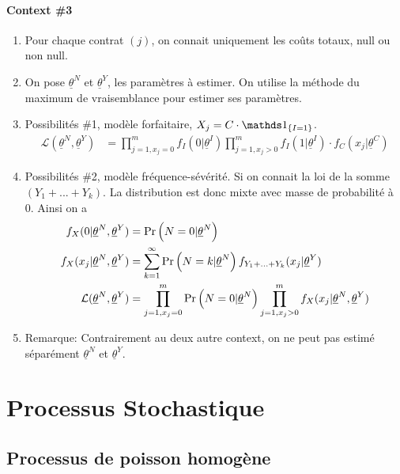 \paragraph{Context \#3}
\begin{enumerate}[label=(\arabic*)]
    \item Pour chaque contrat $(j)$, on connait uniquement les coûts totaux, null ou non null.
    \item On pose $\underline{\theta}^N$ et $\underline{\theta}^Y$, les paramètres à estimer. On utilise la méthode du maximum de vraisemblance pour estimer ses paramètres. 
    \item Possibilités \#1, modèle forfaitaire, $X_j = C \cdot \indic{I=1}$.
        \begin{align*}
            \mathcal{L}(\underline{\theta}^N,\underline{\theta}^Y) &= \prod_{j=1,x_j=0}^m f_I(0|\underline{\theta}^I) \prod_{j=1,x_j>0}^m f_I(1|\underline{\theta}^I) \cdot f_C(x_j|\underline{\theta}^C) 
        \end{align*}
    \item Possibilités \#2, modèle fréquence-sévérité. Si on connait la loi de la somme $(Y_1+...+Y_k)$. La distribution est donc mixte avec masse de probabilité à 0. Ainsi on a
    \begin{align*}
        f_X(0|\underline{\theta}^N,\underline{\theta}^Y) &= \Pr \left( N=0|\underline{\theta}^N \right) \\
        f_X(x_j|\underline{\theta}^N,\underline{\theta}^Y) &= \sum_{k=1}^\infty \Pr \left( N=k|\underline{\theta}^N \right) f_{Y_1+...+Y_k}(x_j|\underline{\theta}^Y) \\
        \mathcal{L}(\underline{\theta}^N,\underline{\theta}^Y) &= \prod_{j=1,x_j=0}^m \Pr \left( N=0|\underline{\theta}^N \right) \prod_{j=1,x_j>0}^m f_X(x_j|\underline{\theta}^N,\underline{\theta}^Y)
    \end{align*}
    \item Remarque: Contrairement au deux autre context, on ne peut pas estimé séparément $\underline{\theta}^N$ et $\underline{\theta}^Y$.
\end{enumerate}

\section{Processus Stochastique}

\subsection{Processus de poisson homogène}
